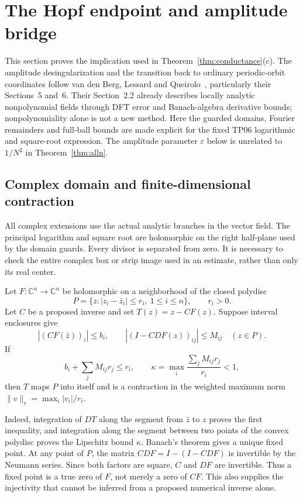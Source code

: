 \documentclass[11pt]{article}
\theoremstyle{definition}
\begin{document}
\section{The Hopf endpoint and amplitude bridge}\label{sec:hopf-methods}

This section proves the implication used in Theorem~\ref{thm:conductance}(c). The amplitude desingularization and the transition back to ordinary periodic-orbit coordinates follow van den Berg, Lessard and Queirolo~\cite{vblq2021}, particularly their Sections~5 and~6. Their Section~2.2 already describes locally analytic nonpolynomial fields through DFT error and Banach-algebra derivative bounds; nonpolynomiality alone is not a new method. Here the guarded domains, Fourier remainders and full-ball bounds are made explicit for the fixed TP06 logarithmic and square-root expression. The amplitude parameter $\varepsilon$ below is unrelated to $1/N^2$ in Theorem~\ref{thm:alln}.

\subsection{Complex domain and finite-dimensional contraction}\label{sec:ha-2}

All complex extensions use the actual analytic branches in the vector field. The principal logarithm and square root are holomorphic on the right half-plane used by the domain guards. Every divisor is separated from zero. It is necessary to check the entire complex box or strip image used in an estimate, rather than only its real center.

Let $F:\mathbb C^n\to\mathbb C^n$ be holomorphic on a neighborhood of the closed polydisc
\[
 P=\{z: |z_i-\bar z_i|\le r_i,\ 1\le i\le n\},\qquad r_i>0.
\]
Let $C$ be a proposed inverse and set $T(z)=z-CF(z)$. Suppose interval enclosures give
\[
 |(CF(\bar z))_i|\le b_i,\qquad
 |(I-CDF(z))_{ij}|\le M_{ij}\quad(z\in P).
\]
If
\[
 b_i+\sum_jM_{ij}r_j\le r_i,\qquad
 \kappa=\max_i\frac{\sum_jM_{ij}r_j}{r_i}<1,
\]
then $T$ maps $P$ into itself and is a contraction in the weighted maximum norm
$\|v\|_r=\max_i|v_i|/r_i$.

Indeed, integration of $DT$ along the segment from $\bar z$ to $z$ proves the first inequality, and integration along the segment between two points of the convex polydisc proves the Lipschitz bound $\kappa$. Banach's theorem gives a unique fixed point. At any point of $P$, the matrix $CDF=I-(I-CDF)$ is invertible by the Neumann series. Since both factors are square, $C$ and $DF$ are invertible. Thus a fixed point is a true zero of $F$, not merely a zero of $CF$. This also supplies the injectivity that cannot be inferred from a proposed numerical inverse alone.
\end{document}
